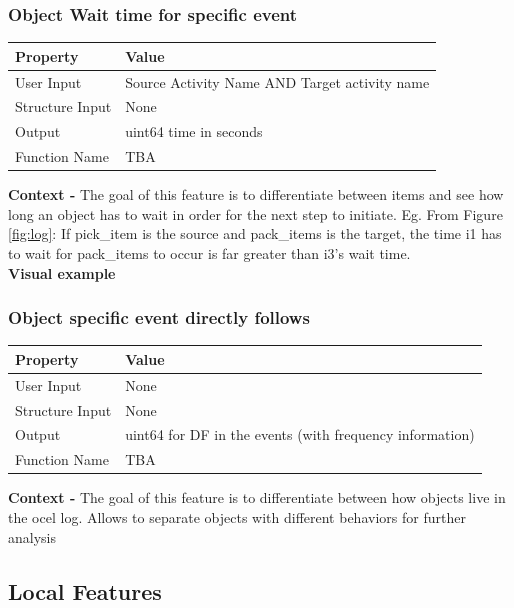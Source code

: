 \documentclass{article}
\begin{document}
\subsubsection{Object Wait time for specific event}
\begin{center}
	\begin{tabular}{| p{3cm} p{7cm} |}
		\hline
		\textbf{Property} & \textbf{Value}\\
		\hline
		User Input & Source Activity Name AND Target activity name\\
		Structure Input & None\\
		Output & uint64 time in seconds\\
		Function Name & TBA\\
		\hline
	\end{tabular}
\end{center}

\textbf{Context -} The goal of this feature is to differentiate between items and see how long an object has to wait in order for the next step to initiate. Eg. From Figure \ref{fig:log}: If pick\_item is the source and pack\_items is the target, the time i1 has to wait for pack\_items to occur is far greater than i3's wait time.
\\

\textbf{Visual example}
\subsubsection{Object specific event directly follows}
\begin{center}
	\begin{tabular}{| p{3cm} p{7cm} |}
		\hline
		\textbf{Property} & \textbf{Value}\\
		\hline
		User Input & None\\
		Structure Input & None\\
		Output & uint64 for DF in the events (with frequency information)\\
		Function Name & TBA\\
		\hline
	\end{tabular}
\end{center}

\textbf{Context -} The goal of this feature is to differentiate between how objects live in the ocel log. Allows to separate objects with different behaviors for further analysis
\\

\subsection{Local Features}
\end{document}
